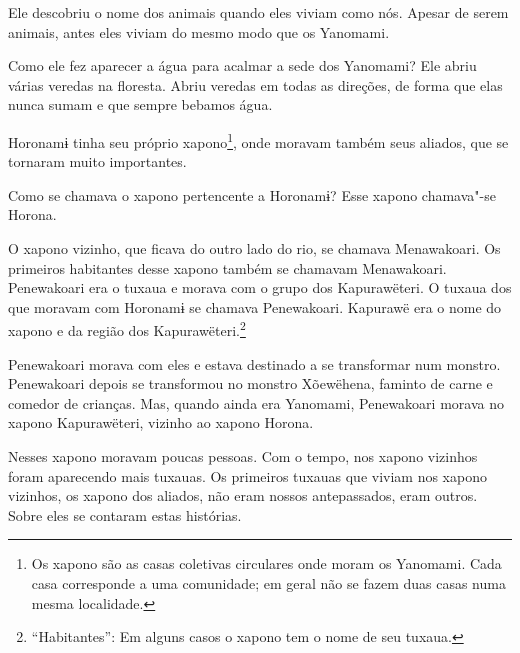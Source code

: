 Ele descobriu o nome dos animais quando eles viviam como nós. Apesar de
serem animais, antes eles viviam do mesmo modo que os Yanomami. 

Como ele fez aparecer a água para acalmar a sede dos Yanomami? Ele abriu
várias veredas na floresta. Abriu veredas em todas as direções, de forma
que elas nunca sumam e que sempre bebamos água. 

Horonamɨ tinha seu próprio xapono\footnote{  Os xapono são as casas coletivas circulares onde moram os Yanomami. Cada
casa corresponde a uma comunidade; em geral não se fazem duas casas numa
mesma localidade.}, onde moravam
também seus aliados, que se tornaram muito importantes. 

Como se chamava o xapono pertencente a Horonamɨ? Esse xapono chamava"-se
Horona. 

O xapono vizinho, que ficava do outro lado do rio, se chamava
Menawakoari. Os primeiros habitantes desse xapono\emph{ }também se
chamavam Menawakoari. Penewakoari era o tuxaua e morava com o grupo dos
Kapurawëteri. O tuxaua dos que moravam com Horonamɨ se chamava
Penewakoari. Kapurawë era o nome do xapono\emph{ }e da região dos
Kapurawëteri.\footnote{  ``Habitantes'': Em alguns casos o xapono tem o nome de seu tuxaua.}

Penewakoari morava com eles e estava destinado a se transformar num
monstro. Penewakoari depois se transformou no monstro Xõewëhena, faminto
de carne e comedor de crianças. Mas, quando ainda era Yanomami,
Penewakoari morava no xapono Kapurawëteri, vizinho ao
xapono\emph{ }Horona.

Nesses xapono moravam poucas pessoas. Com o tempo, nos xapono vizinhos
foram aparecendo mais tuxauas. Os primeiros tuxauas que viviam nos
xapono\emph{ }vizinhos, os xapono dos aliados, não eram nossos
antepassados, eram outros. Sobre eles se contaram estas histórias.

 
